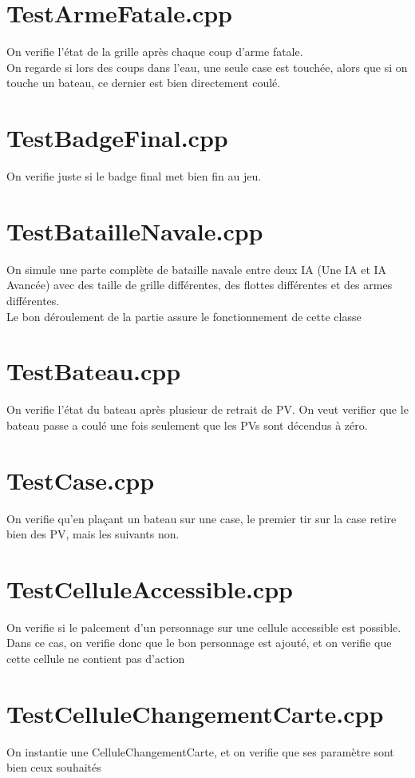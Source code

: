     \section{TestArmeFatale.cpp}
        On verifie l'état de la grille après chaque coup d'arme fatale.\\
        On regarde si lors des coups dans l'eau, une seule case est touchée, alors que si on touche un bateau, ce dernier est bien directement coulé.
    \section{TestBadgeFinal.cpp}
        On verifie juste si le badge final met bien fin au jeu.
    \section{TestBatailleNavale.cpp}
        On simule une parte complète de bataille navale entre deux IA (Une IA et IA Avancée) avec des taille de grille différentes, des flottes différentes et des armes différentes.\\
        Le bon déroulement de la partie assure le fonctionnement de cette classe
    \section{TestBateau.cpp}
        On verifie l'état du bateau après plusieur de retrait de PV. On veut verifier que le bateau passe a coulé une fois seulement que les PVs sont décendus à zéro.
    \section{TestCase.cpp}
        On verifie qu'en plaçant un bateau sur une case, le premier tir sur la case retire bien des PV, mais les suivants non.
    \section{TestCelluleAccessible.cpp}
        On verifie si le palcement d'un personnage sur une cellule accessible est possible.\\
        Dans ce cas, on verifie donc que le bon personnage est ajouté, et on verifie que cette cellule ne contient pas d'action
    \section{TestCelluleChangementCarte.cpp}
        On instantie une CelluleChangementCarte, et on verifie que ses paramètre sont bien ceux souhaités
